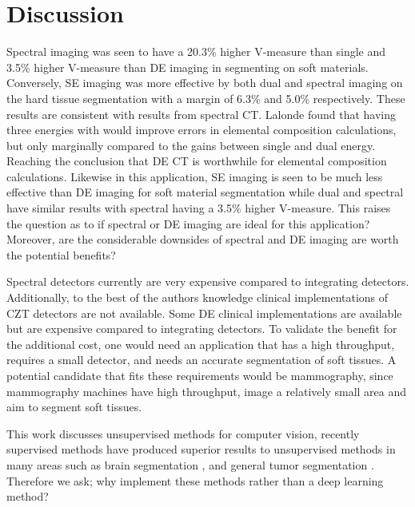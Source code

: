 \documentclass[a4paper,11pt]{article}
\begin{document}

\section{Discussion}

Spectral imaging was seen to have a 20.3\% higher V-measure than single and 3.5\% higher V-measure than DE imaging in segmenting on soft materials. Conversely, SE imaging was more effective by both dual and spectral imaging on the hard tissue segmentation with a margin of 6.3\% and 5.0\% respectively. These results are consistent with results from spectral CT. Lalonde \cite{Lalonde2016ACT} found that having three energies with would improve errors in elemental composition calculations, but only marginally compared to the gains between single and dual energy. Reaching the conclusion that DE CT is worthwhile for elemental composition calculations. Likewise in this application, SE imaging is seen to be much less effective than DE imaging for soft material segmentation while dual and spectral have similar results with spectral having a 3.5\% higher V-measure. This raises the question as to if spectral or DE imaging are ideal for this application? Moreover, are the considerable downsides of spectral and DE imaging are worth the potential benefits?

Spectral detectors currently are very expensive compared to integrating detectors. Additionally, to the best of the authors knowledge clinical implementations of CZT detectors are not available. Some DE clinical implementations are available but are expensive compared to integrating detectors. To validate the benefit for the additional cost, one would need an application that has a high throughput, requires a small detector, and needs an accurate segmentation of soft tissues. A potential candidate that fits these requirements would be mammography, since mammography machines have high throughput, image a relatively small area and aim to segment soft tissues. 

This work discusses unsupervised methods for computer vision, recently supervised methods have produced superior results to unsupervised methods in many areas such as brain segmentation \cite{Bakas2018IdentifyingChallenge}, and general tumor segmentation \cite{MedicalDecathlon}. Therefore we ask; why implement these methods rather than a deep learning method?
\end{document}
